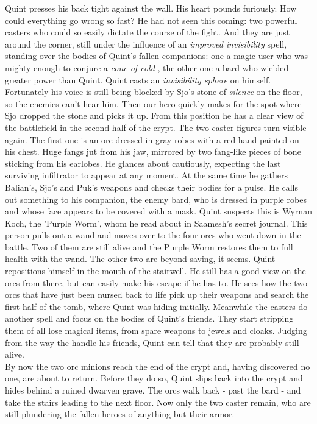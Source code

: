 Quint presses his back tight against the wall. His heart pounds furiously. How could everything go wrong so fast? He had not seen this coming: two powerful casters who could so easily dictate the course of the fight. And they are just around the corner, still under the influence of an {\itshape improved invisibility} spell, standing over the bodies of Quint's fallen companions: one a magic-user who was mighty enough to conjure a  {\itshape cone of cold} , the other one a bard who wielded greater power than Quint. Quint casts an {\itshape invisibility sphere} on himself. Fortunately his voice is still being blocked by Sjo's stone of  {\itshape silence} on the floor, so the enemies can't hear him. Then our hero quickly makes for the spot where Sjo dropped the stone and picks it up. From this position he has a clear view of the battlefield in the second half of the crypt. The two caster figures turn visible again. The first one is an orc dressed in gray robes with a red hand painted on his chest. Huge fangs jut from his jaw, mirrored by two fang-like pieces of bone sticking from his earlobes. He glances about cautiously, expecting the last surviving infiltrator to appear at any moment. At the same time he gathers Balian's, Sjo's and Puk's weapons and checks their bodies for a pulse. He calls out something to his companion, the enemy bard, who is dressed in purple robes and whose face appears to be covered with a mask. Quint suspects this is Wyrnan Koch, the 'Purple Worm', whom he read about in Saamesh's secret journal. This person pulls out a wand and moves over to the four orcs who went down in the battle. Two of them are still alive and the Purple Worm restores them to full health with the wand. The other two are beyond saving, it seems. Quint repositions himself in the mouth of the stairwell. He still has a good view on the orcs from there, but can easily make his escape if he has to. He sees how the two orcs that have just been nursed back to life pick up their weapons and search the first half of the tomb, where Quint was hiding initially. Meanwhile the casters do another spell and focus on the bodies of Quint's friends. They start stripping them of all lose magical items, from spare weapons to jewels and cloaks. Judging from the way the handle his friends, Quint can tell that they are probably still alive.\\

By now the two orc minions reach the end of the crypt and, having discovered no one, are about to return. Before they do so, Quint slips back into the crypt and hides behind a ruined dwarven grave. The orcs walk back - past the bard - and take the stairs leading to the next floor. Now only the two caster remain, who are still plundering the fallen heroes of anything but their armor.\\

